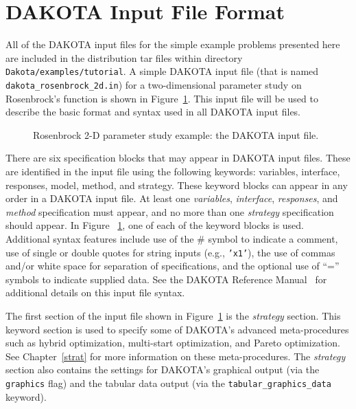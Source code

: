 \section{DAKOTA Input File Format}\label{tutorial:dakota}

All of the DAKOTA input files for the simple example problems
presented here are included in the distribution tar files within
directory \texttt{Dakota/examples/tutorial}. A simple DAKOTA
input file (that is named \texttt{dakota\_rosenbrock\_2d.in})
for a two-dimensional parameter study on Rosenbrock's
function is shown in Figure~\ref{tutorial:rosenbrock_2d}.
This input file will be used to
describe the basic format and syntax used in all DAKOTA input files.

\begin{figure}[ht!]
  \centering
  \begin{bigbox}
    \begin{small}
    \end{small}
  \end{bigbox}
  \caption{Rosenbrock 2-D parameter study example: the DAKOTA input
    file.}
  \label{tutorial:rosenbrock_2d}
\end{figure}

There are six specification blocks that may appear in DAKOTA input
files. These are identified in the input file using the following
keywords: variables, interface, responses, model, method, and strategy. These
keyword blocks can appear in any order in a DAKOTA input file. At
least one \emph{variables}, \emph{interface}, \emph{responses}, and
\emph{method} specification must appear, and no more than one
\emph{strategy} specification should appear. In Figure~
\ref{tutorial:rosenbrock_2d}, one of each of the keyword blocks is
used.  Additional syntax features include use of the \#
symbol to indicate a comment, use of single or double quotes for string inputs
(e.g., \texttt{'x1'}), the use of commas and/or white space for separation of
specifications, and the optional use of ``='' symbols to indicate
supplied data. See the DAKOTA Reference
Manual~\cite{RefMan} for additional details on this input file syntax.

The first section of the input file shown in
Figure~\ref{tutorial:rosenbrock_2d} is the \emph{strategy} section.
This keyword section is used to specify some of DAKOTA's advanced
meta-procedures such as hybrid optimization, 
multi-start optimization, and Pareto optimization.
See Chapter~\ref{strat} for more information on these
meta-procedures. The \emph{strategy} section also contains the
settings for DAKOTA's graphical output (via the \texttt{graphics}
flag) and the tabular data output (via the
\texttt{tabular\_graphics\_data} keyword).

